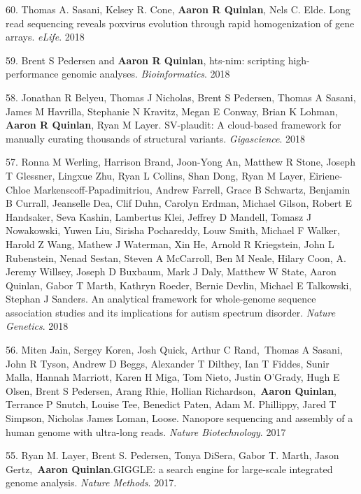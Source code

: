 \documentclass[margin,line]{cv}
\begin{document}
\begin{resume}
\begin{list}{*}{}
    \item[60.] Thomas A. Sasani, Kelsey R. Cone, \textbf{Aaron R Quinlan}, Nels C. Elde. Long read sequencing reveals poxvirus evolution through rapid homogenization of gene arrays. \emph{eLife}. 2018

    \item[59.] Brent S Pedersen and \textbf{Aaron R Quinlan}, hts-nim: scripting high-performance genomic analyses. \emph{Bioinformatics}. 2018

    \item[58.] Jonathan R Belyeu, Thomas J Nicholas, Brent S Pedersen, Thomas A Sasani, James M Havrilla, Stephanie N Kravitz, Megan E Conway, Brian K Lohman, \textbf{Aaron R Quinlan}, Ryan M Layer. SV-plaudit: A cloud-based framework for manually curating thousands of structural variants. \emph{Gigascience}. 2018

    \item[57.] Ronna M Werling, Harrison Brand, Joon-Yong An, Matthew R Stone, Joseph T Glessner, Lingxue Zhu, Ryan L Collins, Shan Dong, Ryan M Layer, Eiriene-Chloe Markenscoff-Papadimitriou, Andrew Farrell, Grace B Schwartz, Benjamin B Currall, Jeanselle Dea, Clif Duhn, Carolyn Erdman, Michael Gilson, Robert E Handsaker, Seva Kashin, Lambertus Klei, Jeffrey D Mandell, Tomasz J Nowakowski, Yuwen Liu, Sirisha Pochareddy, Louw Smith, Michael F Walker, Harold Z Wang, Mathew J Waterman, Xin He, Arnold R Kriegstein, John L Rubenstein, Nenad Sestan, Steven A McCarroll, Ben M Neale, Hilary Coon, A. Jeremy Willsey, Joseph D Buxbaum, Mark J Daly, Matthew W State, Aaron Quinlan, Gabor T Marth, Kathryn Roeder, Bernie Devlin, Michael E Talkowski, Stephan J Sanders.
    An analytical framework for whole-genome sequence association studies and its implications for autism spectrum disorder. \emph{Nature Genetics}. 2018

    \item[56.] Miten Jain, Sergey Koren, Josh Quick, Arthur C Rand, Thomas A Sasani, John R Tyson, Andrew D Beggs, Alexander T Dilthey, Ian T Fiddes, Sunir Malla, Hannah Marriott, Karen H Miga, Tom Nieto, Justin O'Grady, Hugh E Olsen, Brent S Pedersen, Arang Rhie, Hollian Richardson, \textbf{Aaron Quinlan}, Terrance P Snutch, Louise Tee, Benedict Paten, Adam M. Phillippy, Jared T Simpson, Nicholas James Loman, Loose. 
    Nanopore sequencing and assembly of a human genome with ultra-long reads. \emph{Nature Biotechnology}. 2017

    \item[55.] Ryan M. Layer, Brent S. Pedersen, Tonya DiSera, Gabor T. Marth, Jason Gertz, \textbf{Aaron Quinlan}.GIGGLE: a search engine for large-scale integrated genome analysis. \emph{Nature Methods}. 2017.


\end{list}
\end{resume}
\end{document}
